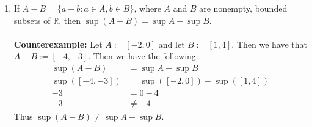 \documentclass[12pt,letterpaper]{article}
\theoremstyle{case}
\begin{document}
\begin{enumerate}
\begin{enumerate}
\begin{proof}
			\\\\Now we must show that $\sup A + \sup B \leq \sup (A+B)$.
			\\\\Let $y \in B$ be fixed. Since $x+y \leq \sup (A+B)$, then $x \leq \sup (A+B)-y,\ \forall x \in A$. So $\sup (A+B)-y$ is an upper bound for $A$. By completeness, we have that $\sup A \leq \sup (A+B)-y$. Then $y \leq \sup (A+B)-\sup A$. This is true for all $y \in B$.
			\\\\So $\sup (A+B)-\sup A$ is an upper bound for B, and $\sup B \leq \sup (A+B)- \sup A$.
			\\\\$\therefore \sup A + \sup B \leq \sup (A+B)$.
		\end{proof}
		\item If $A - B=\{a-b:a \in A, b \in B\}$, where $A$ and $B$ are nonempty, bounded subsets of $\mathbb{R}$, then $\sup(A - B)=\sup A - \sup B$.
		\\\\ \textbf{Counterexample:} Let $A := [-2, 0]$ and let $B := [1,4]$. Then we have that $A-B := [-4, -3]$. Then we have the following:
		\begin{align*}
		\sup (A-B) &= \sup A - \sup B
		\\ \sup ([-4,-3]) &= \sup ([-2, 0]) - \sup ([1,4])
		\\ -3 &= 0 - 4
		\\ -3 &\neq -4
		\end{align*}
		Thus $\sup (A-B) \neq \sup A - \sup B$.
	\end{enumerate}
	\end{enumerate}
\end{document}
